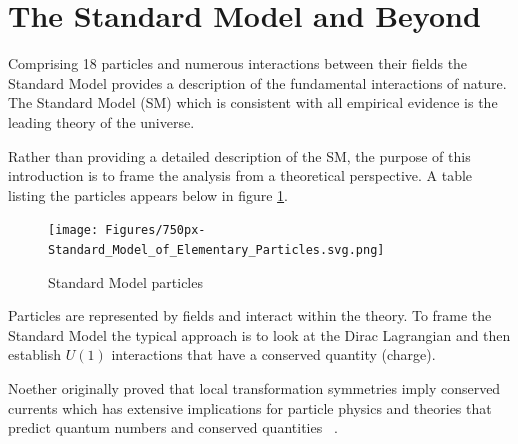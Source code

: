 \section{The Standard Model and Beyond}




Comprising 18 particles and numerous interactions between their fields the Standard Model provides a description of the fundamental interactions of nature.
The Standard Model (SM) which is consistent with all empirical evidence is the leading theory of the universe. 


Rather than providing a detailed description of the SM, the purpose of this introduction is to frame the analysis from a theoretical perspective.
A table listing the particles appears below in figure \ref{fig:SM}. 
\begin{figure}[ht!b]
  \centering
  \texttt{[image: Figures/750px-Standard\_Model\_of\_Elementary\_Particles.svg.png]}
  \caption{\label{fig:SM} Standard Model particles }
\end{figure}

Particles are represented by fields and interact within the theory. To frame the Standard Model the typical approach is to look at the Dirac Lagrangian and then establish $U(1)$ interactions that have a conserved quantity (charge). 



Noether originally proved that local transformation symmetries imply conserved currents which has extensive implications for particle physics and theories that predict quantum numbers and conserved quantities ~\cite{Noether_1971}. 

